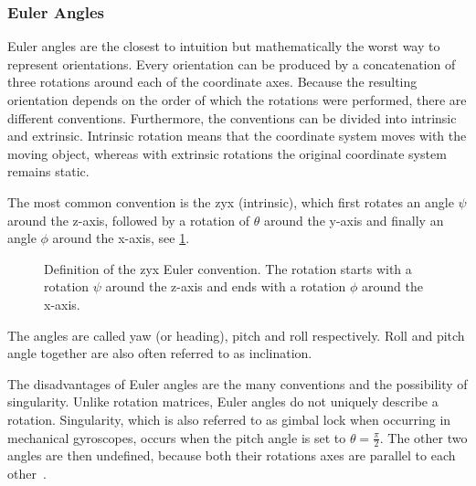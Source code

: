 \subsubsection{Euler Angles}
Euler angles are the closest to intuition but mathematically the worst way to represent orientations.
Every orientation can be produced by a concatenation of three rotations around each of the coordinate axes.
Because the resulting orientation depends on the order of which the rotations were performed, there are different conventions.
Furthermore, the conventions can be divided into intrinsic and extrinsic.
Intrinsic rotation means that the coordinate system moves with the moving object, whereas with extrinsic rotations the original coordinate system remains static.\par
The most common convention is the zyx (intrinsic), which first rotates an angle $\psi$ around the z-axis, followed by a rotation of $\theta$ around the y-axis and finally an angle $\phi$ around the x-axis, see \cref{fig:tikz_euler_angles}.
\begin{figure}[htpb]
    \centering
    
    \caption[zxy Euler convention]{Definition of the zyx Euler convention. The rotation starts with a rotation $\psi$ around the z-axis and ends with a rotation $\phi$ around the x-axis.}
    \label{fig:tikz_euler_angles}
\end{figure}

The angles are called yaw (or heading), pitch and roll respectively. Roll and pitch angle together are also often referred to as inclination.\par
The disadvantages of Euler angles are the many conventions and the possibility of singularity.
Unlike rotation matrices, Euler angles do not uniquely describe a rotation.
Singularity, which is also referred to as gimbal lock when occurring in mechanical gyroscopes, occurs when the pitch angle is set to $\theta = \frac{\pi}{2}$.
The other two angles are then undefined, because both their rotations axes are parallel to each other~\cite{Kok2017}.


